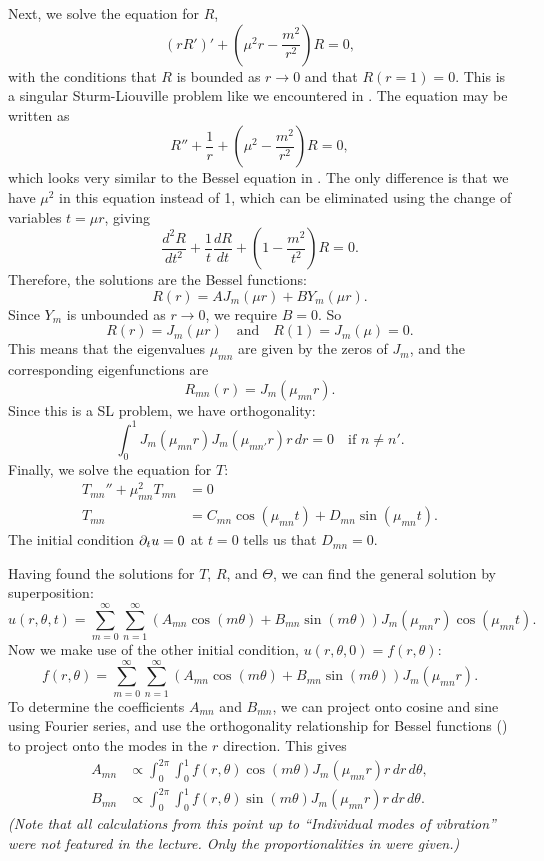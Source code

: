 \begin{enumerate}
	Next, we solve the equation for $R$,
	\[
	(rR')' + \left(\mu^2r - \frac{m^2}{r^2}\right)R = 0,
	\]
	with the conditions that $R$ is bounded as $r\to 0$ and that $R(r=1)=0$. This is a singular Sturm-Liouville problem like we encountered in . The equation may be written as
	\[
	R'' + \frac{1}{r} + \left(\mu^2 - \frac{m^2}{r^2}\right)R = 0,
	\]
	which looks very similar to the Bessel equation in . The only difference is that we have $\mu^2$ in this equation instead of 1, which can be eliminated using the change of variables $t= \mu r$, giving
	\[
	\frac{d^2R}{dt^2} + \frac{1}{t} \frac{dR}{dt} + \left(1- \frac{m^2}{t^2}\right)R = 0.
	\]
	Therefore, the solutions are the Bessel functions:
	\[
	R(r) = AJ_m(\mu r) + BY_m(\mu r).
	\]
	Since $Y_m$ is unbounded as $r \to 0$, we require $B=0$. So
	\[
	R(r) = J_m(\mu r) \quad\text{and}\quad R(1) = J_m(\mu) = 0.
	\]
	This means that the eigenvalues $\mu_{mn}$ are given by the zeros of $J_m$, and the corresponding eigenfunctions are
	\[
	R_{mn}(r) = J_m(\mu_{mn}r).
	\]
	Since this is a SL problem, we have orthogonality:
	\begin{equation}\label{eq:slorthog}
		\int_0^1 J_m(\mu_{mn}r) J_m(\mu_{mn'}r) r \,dr = 0 \quad\text{if } n \neq n'.
	\end{equation}
	Finally, we solve the equation for $T$:
	\begin{align*}
		T_{mn}'' + \mu_{mn}^2 T_{mn} &= 0 \\
		T_{mn} &= C_{mn}\cos(\mu_{mn}t) + D_{mn}\sin(\mu_{mn}t).
	\end{align*}
	The initial condition $\partial_tu = 0$ at $t=0$ tells us that $D_{mn}=0$.
	
	Having found the solutions for $T$, $R$, and $\Theta$, we can find the general solution by superposition:
	\[
	u(r,\theta,t) = \sum_{m=0}^{\infty} \sum_{n=1}^{\infty} \left(A_{mn}\cos(m\theta) + B_{mn}\sin(m\theta)\right) J_m(\mu_{mn}r) \cos(\mu_{mn}t).
	\]
	Now we make use of the other initial condition, $u(r,\theta,0) = f(r,\theta)$:
	\[
	f(r,\theta) = \sum_{m=0}^{\infty} \sum_{n=1}^{\infty} \left(A_{mn}\cos(m\theta) + B_{mn}\sin(m\theta)\right) J_m(\mu_{mn}r).
	\]
	To determine the coefficients $A_{mn}$ and $B_{mn}$, we can project onto cosine and sine using Fourier series, and use the orthogonality relationship for Bessel functions () to project onto the modes in the $r$ direction. This gives
	\begin{align}
		\label{eq:wave2ddiscprop1}
		A_{mn} &\propto \int_0^{2\pi} \int_0^1 f(r,\theta) \cos(m\theta) J_m(\mu_{mn}r) r \,dr\,d\theta, \\
		\label{eq:wave2ddiscprop2}
		B_{mn} &\propto \int_0^{2\pi} \int_0^1 f(r,\theta) \sin(m\theta) J_m(\mu_{mn}r) r \,dr\,d\theta.
	\end{align}
	\emph{(Note that all calculations from this point up to ``Individual modes of vibration'' were not featured in the lecture. Only the proportionalities in  were given.)}
	

\end{enumerate}
